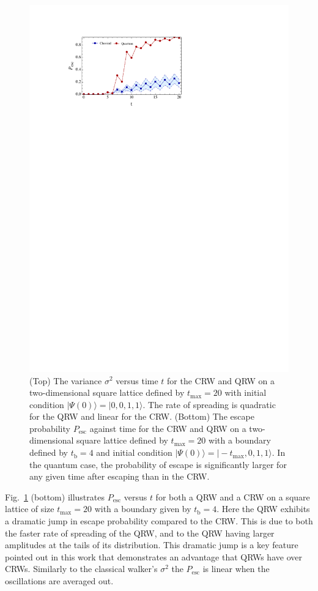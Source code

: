 \documentclass[aps,pra,twocolumn,amsmath,amssymb,nofootinbib,superscriptaddress]{revtex4}
\newcommand{\ket}[1]{|#1\rangle}
\newcommand{\keith}[1]{{\color{cyan}{#1}}}
\begin{document}
\begin{figure}[!htb]
\includegraphics[scale=0.88]{PescVsTime.pdf}
\caption{\label{fig:PescVsTime} (Top) The variance $\sigma^{2}$ versus time $t$ for the CRW and QRW on a two-dimensional square lattice defined by $t_\mathrm{max}=20$ with initial condition $\ket{\Psi(0)}=\ket{0,0,1,1}$. The rate of spreading is quadratic for the QRW and linear for the CRW. (Bottom) The escape probability $P_\mathrm{esc}$ against time for the CRW and QRW on a two-dimensional square lattice defined by $t_\mathrm{max}=20$ with a boundary defined by $t_\mathrm{b}=4$ and initial condition $\ket{\Psi(0)}=\ket{-t_{\mathrm{max}},0,1,1}$. In the quantum case, the probability of escape is significantly larger for any given time after escaping than in the CRW.}
\end{figure}

Fig.~\ref{fig:PescVsTime} (bottom) illustrates $P_\mathrm{esc}$ versus $t$ for both a QRW and a CRW on a square lattice of size $t_\mathrm{max}=20$ with a boundary given by $t_\mathrm{b}=4$. Here the QRW exhibits a dramatic jump in escape probability compared to the CRW. This is due to both the faster rate of spreading of the QRW, and to the QRW having larger amplitudes at the tails of its distribution. This dramatic jump is a key feature pointed out in this work that demonstrates an advantage that QRWs have over CRWs. Similarly to the classical walker's $\sigma^{2}$ the $P_{\mathrm{esc}}$ is linear when the oscillations are averaged out. \keith{C) The walkers reach the escape boundary in a time that is regarded as the transient regime, where long-time evolution has not set in.} 
\end{document}
